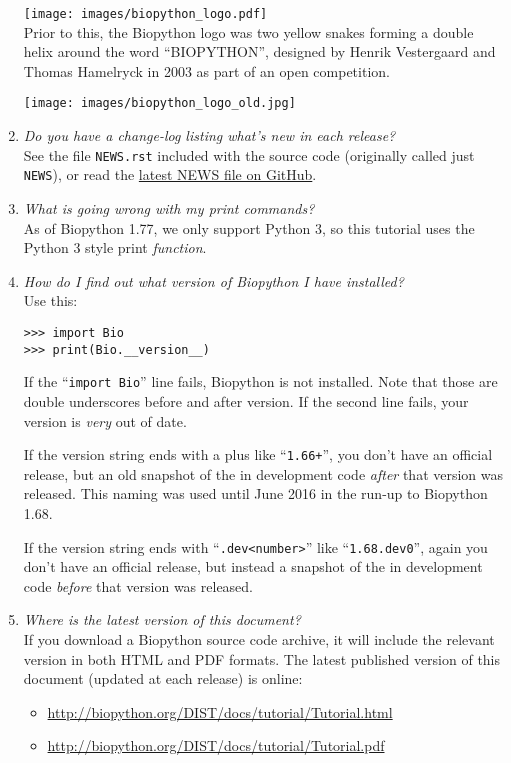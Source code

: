 \begin{enumerate}
  \texttt{[image: images/biopython\_logo.pdf]}\\

  Prior to this, the Biopython logo was two yellow snakes forming a double
  helix around the word ``BIOPYTHON'', designed by Henrik Vestergaard and
  Thomas Hamelryck in 2003 as part of an open competition.

  \texttt{[image: images/biopython\_logo\_old.jpg]}\\

  \item \emph{Do you have a change-log listing what's new in each release?} \\
  See the file \verb|NEWS.rst| included with the source code (originally called
  just \verb|NEWS|), or read the
  \href{https://github.com/biopython/biopython/blob/master/NEWS.rst}{latest NEWS file on GitHub}.

  \item \emph{What is going wrong with my print commands?} \\
  As of Biopython 1.77, we only support Python 3, so this tutorial
  uses the Python 3 style print \emph{function}.

  \item \emph{How do I find out what version of Biopython I have installed?} \\
  Use this:
\begin{verbatim}
>>> import Bio
>>> print(Bio.__version__)
\end{verbatim}
  If the ``\verb|import Bio|'' line fails, Biopython is not installed.
  Note that those are double underscores before and after version.
  If the second line fails, your version is \emph{very} out of date.

  If the version string ends with a plus like ``\verb|1.66+|'', you
  don't have an official release, but an old snapshot of the in
  development code \emph{after} that version was released. This naming
  was used until June 2016 in the run-up to Biopython 1.68.

  If the version string ends with ``\verb|.dev<number>|'' like
  ``\verb|1.68.dev0|'', again you don't have an official release,
  but instead a snapshot of the in development code \emph{before}
  that version was released.

  \item \emph{Where is the latest version of this document?}\\
  If you download a Biopython source code archive, it will include the
  relevant version in both HTML and PDF formats.  The latest published
  version of this document (updated at each release) is online:
  \begin{itemize}
  \item \url{http://biopython.org/DIST/docs/tutorial/Tutorial.html}
  \item \url{http://biopython.org/DIST/docs/tutorial/Tutorial.pdf}
  \end{itemize}


\end{enumerate}
